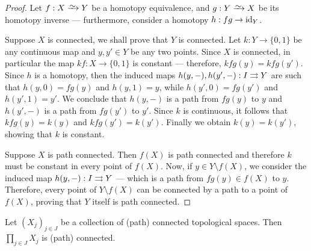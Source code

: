 \begin{proof}
Let \(f: X \isoto Y\) be a homotopy equivalence, and \(g: Y \isoto X\) be its
homotopy inverse --- furthermore, consider a homotopy \(h: fg \to \operatorname{id}_Y\).

Suppose \(X\) is connected, we shall prove that \(Y\) is connected. Let
\(k: Y \to \{0, 1\}\) be any continuous map and \(y, y' \in Y\) be any two
points. Since \(X\) is connected, in particular the map \(k f: X \to \{0, 1\}\)
is constant --- therefore, \(k f g(y) = k f g(y')\). Since \(h\) is a homotopy,
then the induced maps \(h(y, -), h(y', -): I \rightrightarrows Y\) are such that
\(h(y, 0) = f g(y)\) and \(h(y, 1) = y\), while \(h(y', 0) = f g(y')\) and
\(h(y', 1) = y'\). We conclude that \(h(y, -)\) is a path from \(fg(y)\) to
\(y\) and \(h(y', -)\) is a path from \(fg(y')\) to \(y'\). Since \(k\) is
continuous, it follows that \(k f g(y) = k(y)\) and \(kfg(y') = k(y')\). Finally
we obtain \(k(y) = k(y')\), showing that \(k\) is constant.

Suppose \(X\) is path connected. Then \(f(X)\) is path connected and therefore
\(k\) must be constant in every point of \(f(X)\). Now, if
\(y \in Y \setminus f(X)\), we consider the induced map \(h(y, -): I \rightrightarrows Y\)
--- which is a path from \(fg(y) \in f(X)\) to \(y\). Therefore, every point of
\(Y \setminus f(X)\) can be connected by a path to a point of \(f(X)\), proving
that \(Y\) itself is path connected.
\end{proof}

\begin{proposition}
\label{prop:products-preserve-connectedness}
Let \((X_{j})_{j \in J}\) be a collection of (path) connected topological
spaces. Then \(\prod_{j \in J} X_j\) is (path) connected.
\end{proposition}

